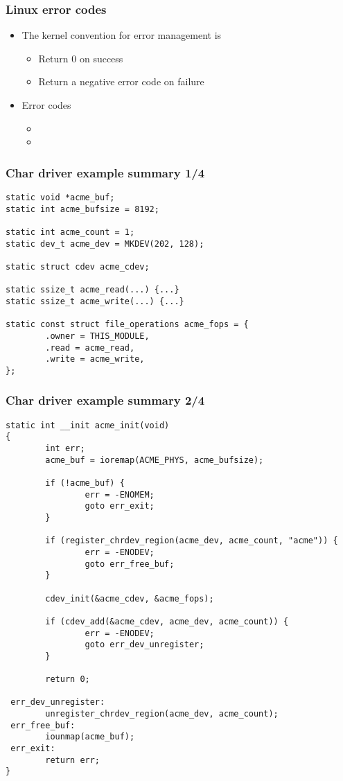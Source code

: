 \begin{frame}
  \frametitle{Linux error codes}
  \begin{itemize}
  \item The kernel convention for error management is
    \begin{itemize}
    \item Return 0 on success
    \item Return a negative error code on failure
    \end{itemize}
  \item Error codes
    \begin{itemize}
    \item {}
    \item {}
    \end{itemize}
  \end{itemize}
\end{frame}

\begin{frame}[fragile]
  \frametitle{Char driver example summary 1/4}
\begin{verbatim}
static void *acme_buf;
static int acme_bufsize = 8192;

static int acme_count = 1;
static dev_t acme_dev = MKDEV(202, 128);

static struct cdev acme_cdev;

static ssize_t acme_read(...) {...}
static ssize_t acme_write(...) {...}

static const struct file_operations acme_fops = {
        .owner = THIS_MODULE,
        .read = acme_read,
        .write = acme_write,
};
\end{verbatim}
\end{frame}

\begin{frame}[fragile]
  \frametitle{Char driver example summary 2/4}
\begin{verbatim}
static int __init acme_init(void)
{
        int err;
        acme_buf = ioremap(ACME_PHYS, acme_bufsize);

        if (!acme_buf) {
                err = -ENOMEM;
                goto err_exit;
        }

        if (register_chrdev_region(acme_dev, acme_count, "acme")) {
                err = -ENODEV;
                goto err_free_buf;
        }

        cdev_init(&acme_cdev, &acme_fops);

        if (cdev_add(&acme_cdev, acme_dev, acme_count)) {
                err = -ENODEV;
                goto err_dev_unregister;
        }

        return 0;

 err_dev_unregister:
        unregister_chrdev_region(acme_dev, acme_count);
 err_free_buf:
        iounmap(acme_buf);
 err_exit:
        return err;
}
\end{verbatim}
\end{frame}

